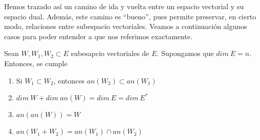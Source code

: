 Hemos trazado así un camino de ida y vuelta entre un espacio vectorial y su espacio dual. Además, este camino es ``bueno'', pues permite preservar, en cierto modo, relaciones entre subespacio vectoriales. Veamos a continuación algunos casos para poder entender a que nos referimos exactamente.
\begin{lem}\label{C1_lem_propiedadespasodual}
	Sean $W,W_1,W_2\subset E$ subesapcio vectoriales de $E$. Supongamos que $dim \ E=n$. Entonces, se cumple
	\begin{enumerate}
		\item Si $W_1\subset W_2$, entonces $an(W_2)\subset an(W_1)$
		
		\item $dim \ W+dim \ an(W)=dim \ E=dim \ E^*$
		
		\item $an(an(W))=W$
		
		\item $an(W_1+W_2)=an(W_1)\cap an(W_2)$
	\end{enumerate}
\end{lem}
